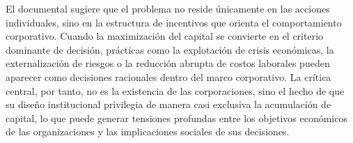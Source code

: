 El documental sugiere que el problema no reside únicamente en las acciones individuales, sino en la estructura de incentivos que orienta el comportamiento corporativo. Cuando la maximización del capital se convierte en el criterio dominante de decisión, prácticas como la explotación de crisis económicas, la externalización de riesgos o la reducción abrupta de costos laborales pueden aparecer como decisiones racionales dentro del marco corporativo. La crítica central, por tanto, no es la existencia de las corporaciones, sino el hecho de que su diseño institucional privilegia de manera casi exclusiva la acumulación de capital, lo que puede generar tensiones profundas entre los objetivos económicos de las organizaciones y las implicaciones sociales de sus decisiones.
